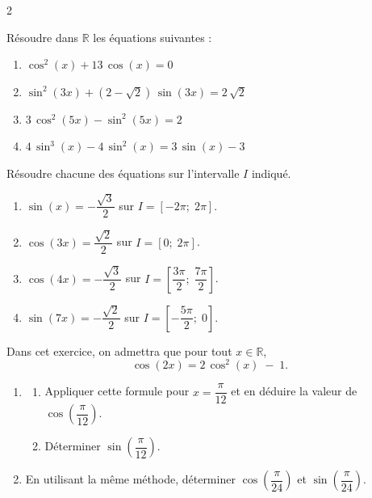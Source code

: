 \documentclass[a4paper,12pt]{article}
\begin{document}
\begin{multicols}{2}
          \begin{exercice}[title=Exercice 24 $\star\star\star$ { [Calculer] }]{}{}
          Résoudre dans \(\mathbb{R}\) les équations suivantes :
          \begin{enumerate}
            \item \(\cos^2(x) + 13\,\cos(x) = 0\)
            \item \(\sin^2(3x) + \left(2 - \sqrt{2}\right)\,\sin(3x) = 2\,\sqrt{2}\)
            \item \(3\,\cos^2(5x) - \sin^2(5x) = 2\)
            \item \(4\,\sin^3(x) - 4\,\sin^2(x) = 3\,\sin(x) - 3\)
          \end{enumerate}
          \end{exercice}
          
          \begin{exercice}[title=Exercice 25 $\star\star\star$ { [Représenter, Calculer] }]{}{}
          Résoudre chacune des équations sur l’intervalle \(I\) indiqué.
          \begin{enumerate}
            \item \(\sin(x) = -\dfrac{\sqrt{3}}{2}\) sur \(I = [-2\pi;\;2\pi]\).
            \item \(\cos(3x) = \dfrac{\sqrt{2}}{2}\) sur \(I = [0;\;2\pi]\).
            \item \(\cos(4x) = -\dfrac{\sqrt{3}}{2}\) sur \(I = \left[\dfrac{3\pi}{2};\;\dfrac{7\pi}{2}\right]\).
            \item \(\sin(7x) = -\dfrac{\sqrt{2}}{2}\) sur \(I = \left[-\dfrac{5\pi}{2};\;0\right]\).
          \end{enumerate}
          \end{exercice}
          
          \begin{exercice}[title=Exercice 26 $\star\star$ { [Calculer] }]{}{}
          Dans cet exercice, on admettra que pour tout \(x \in \mathbb{R}\),
          \[
          \cos(2x) = 2\,\cos^2(x) \;-\; 1.
          \]
          \begin{enumerate}
            \item
            \begin{enumerate}
              \item Appliquer cette formule pour \(x = \dfrac{\pi}{12}\) et en déduire la valeur de \(\cos\left(\dfrac{\pi}{12}\right)\).
              \item Déterminer \(\sin\left(\dfrac{\pi}{12}\right)\).
            \end{enumerate}
            \item En utilisant la même méthode, déterminer \(\cos\left(\dfrac{\pi}{24}\right)\) et \(\sin\left(\dfrac{\pi}{24}\right)\).
          \end{enumerate}
          \end{exercice}
          

\end{multicols}
\end{document}
